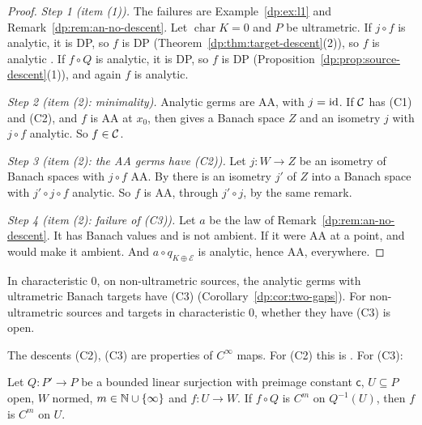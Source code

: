 \begin{proof}
\emph{Step 1 (item (1)).} The failures are Example~\ref{dp:ex:l1} and Remark~\ref{dp:rem:an-no-descent}. Let $\operatorname{char}K=0$ and $P$ be ultrametric. If $j\circ f$ is analytic, it is DP, so $f$ is DP (Theorem~\ref{dp:thm:target-descent}(2)), so $f$ is analytic \cite[Proposition~14.40(2)]{I}. If $f\circ Q$ is analytic, it is DP, so $f$ is DP (Proposition~\ref{dp:prop:source-descent}(1)), and again $f$ is analytic.

\emph{Step 2 (item (2): minimality).} Analytic germs are AA, with $j=\mathrm{id}$. If $\mathcal{C}$ has (C1) and (C2), and $f$ is AA at $x_0$, then \cite[Remark~14.13]{I} gives a Banach space $Z$ and an isometry $j$ with $j\circ f$ analytic. So $f\in\mathcal{C}$.

\emph{Step 3 (item (2): the AA germs have (C2)).} Let $j\colon W\to Z$ be an isometry of Banach spaces with $j\circ f$ AA. By \cite[Remark~14.13]{I} there is an isometry $j'$ of $Z$ into a Banach space with $j'\circ j\circ f$ analytic. So $f$ is AA, through $j'\circ j$, by the same remark.

\emph{Step 4 (item (2): failure of (C3)).} Let $a$ be the law of Remark~\ref{dp:rem:an-no-descent}. It has Banach values and is not ambient. If it were AA at a point, \cite[Remark~14.13]{I} and \cite[Proposition~14.9(2)]{I} would make it ambient. And $a\circ q_{K\oplus\mathcal E}$ is analytic, hence AA, everywhere.
\end{proof}

In characteristic $0$, on non-ultrametric sources, the analytic germs with ultrametric Banach targets have (C3) (Corollary~\ref{dp:cor:two-gaps}). For non-ultrametric sources and targets in characteristic $0$, whether they have (C3) is open.

The descents (C2), (C3) are properties of $C^\infty$ maps. For (C2) this is \cite[Lemma~2.4]{I}. For (C3):

\begin{proposition}\label{dp:prop:cn-descends}
Let $Q\colon P'\to P$ be a bounded linear surjection with preimage constant $\mathsf c$, $U\subseteq P$ open, $W$ normed, $m\in\mathbb N\cup\{\infty\}$ and $f\colon U\to W$. If $f\circ Q$ is $C^m$ on $Q^{-1}(U)$, then $f$ is $C^m$ on $U$.
\end{proposition}

